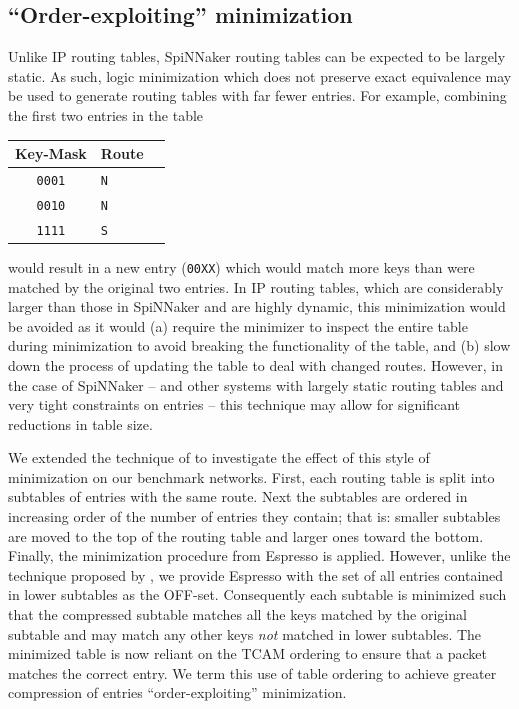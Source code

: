 \documentclass[conference]{IEEEtran}
\newcommand{\mytt}[1]{\texttt{\footnotesize#1}}
\begin{document}
\subsection*{``Order-exploiting'' minimization}

Unlike IP routing tables, SpiNNaker routing tables can be expected to be largely static.
As such, logic minimization which does not preserve exact equivalence may be used to generate routing tables with far fewer entries.
For example, combining the first two entries in the table

  \begin{table}[H]
    \centering
    \begin{tabular}{c l l}
      \toprule
      Key-Mask & Route \\
      \midrule
      \texttt{0001} & \texttt{N} \\
      \texttt{0010} & \texttt{N} \\
      \texttt{1111} & \texttt{S} \\
      \bottomrule
    \end{tabular}
  \end{table}

\noindent would result in a new entry (\mytt{00XX}) which would match more keys than were matched by the original two entries.
In IP routing tables, which are considerably larger than those in SpiNNaker and are highly dynamic, this minimization would be avoided as it would (a) require the minimizer to inspect the entire table during minimization to avoid breaking the functionality of the table,
and (b) slow down the process of updating the table to deal with changed routes.
However, in the case of SpiNNaker -- and other systems with largely static routing tables and very tight constraints on entries -- this technique may allow for significant reductions in table size.

We extended the technique of \textcite{Liu2002} to investigate the effect of this style of minimization on our benchmark networks.
First, each routing table is split into subtables of entries with the same route.
Next the subtables are ordered in increasing order of the number of entries they contain; that is: smaller subtables are moved to the top of the routing table and larger ones toward the bottom.
Finally, the minimization procedure from Espresso is applied.
However, unlike the technique proposed by \textcite{Liu2002}, we provide Espresso with the set of all entries contained in lower subtables as the OFF-set.
Consequently each subtable is minimized such that the compressed subtable matches all the keys matched by the original subtable and may match any other keys \textit{not} matched in lower subtables.
The minimized table is now reliant on the TCAM ordering to ensure that a packet matches the correct entry.
We term this use of table ordering to achieve greater compression of entries ``order-exploiting'' minimization.
\end{document}
